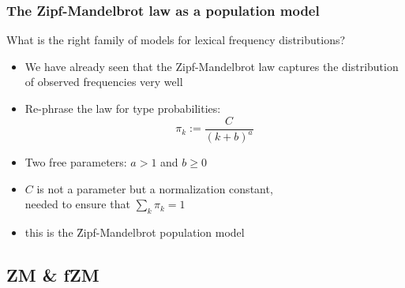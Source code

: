 \documentclass[t]{beamer} %
\begin{document}
\begin{frame}
  \frametitle{The Zipf-Mandelbrot law as a population model}

  What is the right family of models for lexical frequency distributions?
  \begin{itemize}
  \item We have already seen that the Zipf-Mandelbrot law captures the
    distribution of observed frequencies very well%
    \pause
  \item Re-phrase the law for type probabilities:
    \[ \pi_k := \frac{C}{(k + b) ^ a} \]
  \item Two free parameters: $a > 1$ and $b \geq 0$
  \item $C$ is not a parameter but a normalization constant,\\
    needed to ensure that $\sum_k \pi_k = 1$
  \item this is the \h{Zipf-Mandelbrot} population model
  \end{itemize}
\end{frame}

\subsection{ZM \& fZM}
\end{document}
